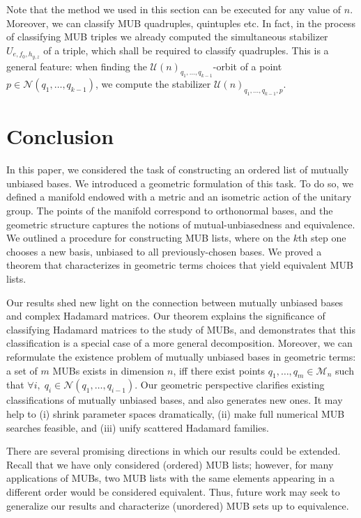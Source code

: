 \documentclass[referee,sn-mathphys-num]{sn-jnl}%
\theoremstyle{thmstyleone}%
\theoremstyle{thmstyletwo}%
\theoremstyle{remark}
\theoremstyle{thmstylethree}%
\begin{document}
Note that the method we used in this section can be executed for any value of $n$. Moreover, we can classify MUB quadruples, quintuples etc. In fact, in the process of classifying MUB triples we already computed the simultaneous stabilizer $ U_{e, f_0, h_{y,z}} $ of a triple, which shall be required to classify quadruples. This is a general feature: when finding the $\mathcal{U} \left( n \right)_{q_1, \ldots, q_{k-1}}$-orbit of a point $ p \in \mathcal{N} \left( q_1, \ldots, q_{k-1} \right) $, we compute the stabilizer $ \mathcal{U} \left( n \right)_{q_1, \ldots, q_{k-1}, p} $.

\section{Conclusion}\label{sec:conclusion}
In this paper, we considered the task of constructing an ordered list of mutually unbiased bases. We introduced a geometric formulation of this task. To do so, we defined a manifold endowed with a metric and an isometric action of the unitary group. The points of the manifold correspond to orthonormal bases, and the geometric structure captures the notions of mutual-unbiasedness and equivalence.
We outlined a procedure for constructing MUB lists, where on the $k$th step one chooses a new basis, unbiased to all previously-chosen bases. We proved a theorem that characterizes in geometric terms choices that yield equivalent MUB lists.

Our results shed new light on the connection between mutually unbiased bases and complex Hadamard matrices. Our theorem explains the significance of classifying Hadamard matrices to the study of MUBs, and demonstrates that this classification is a special case of a more general decomposition. 
Moreover, we can reformulate the existence problem of mutually unbiased bases in geometric terms: a set of $m$ MUBs exists in dimension $n$, iff there exist points $q_1, \ldots, q_m \in \mathcal{M}_n$ such that $\forall i, \; q_i \in \mathcal{N} \left( q_1, \ldots, q_{i-1} \right)$.
Our geometric perspective clarifies existing classifications of mutually unbiased bases, and also generates new ones. It may help to (i) shrink parameter spaces dramatically, (ii) make full numerical MUB searches feasible, and (iii) unify scattered Hadamard families.

There are several promising directions in which our results could be extended. Recall that we have only considered (ordered) MUB lists; however, for many applications of MUBs, two MUB lists with the same elements appearing in a different order would be considered equivalent. Thus, future work may seek to generalize our results and characterize (unordered) MUB sets up to equivalence.
\end{document}
